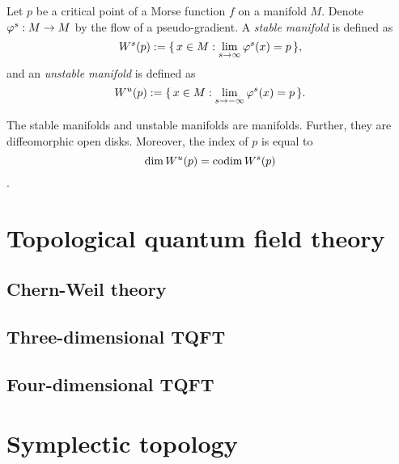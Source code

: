 \documentclass{../../large}
\begin{document}
\begin{defn}
Let $p$ be a critical point of a Morse function $f$ on a manifold $M$.
Denote $\varphi^s:M\to M$ by the flow of a pseudo-gradient.
A \emph{stable manifold} is defined as
\[W^s(p):=\{\,x\in M:\lim_{s\to\infty}\varphi^s(x)=p\,\},\]
and an \emph{unstable manifold} is defined as
\[W^u(p):=\{\,x\in M:\lim_{s\to-\infty}\varphi^s(x)=p\,\}.\]
\end{defn}
\begin{prop}
The stable manifolds and unstable manifolds are manifolds.
Further, they are diffeomorphic open disks.
Moreover, the index of $p$ is equal to
\[\dim W^u(p)=\operatorname{codim} W^s(p)\].
\end{prop}


\chapter{}
\chapter{}



\part{Topological quantum field theory}
\chapter{Chern-Weil theory}
\chapter{Three-dimensional TQFT}
\chapter{Four-dimensional TQFT}

\part{Symplectic topology}
\chapter{}
\chapter{}
\chapter{}
\end{document}

